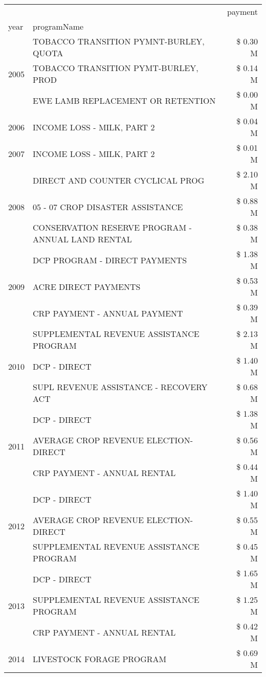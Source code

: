 \begin{tabular}{llr}
\toprule
 &  & payment \\
year & programName &  \\
\midrule
\multirow[t]{3}{*}{2005} & TOBACCO TRANSITION PYMNT-BURLEY, QUOTA & \$ 0.30 M \\
 & TOBACCO TRANSITION PYMT-BURLEY, PROD & \$ 0.14 M \\
 & EWE LAMB REPLACEMENT OR RETENTION & \$ 0.00 M \\
\cline{1-3}
2006 & INCOME LOSS - MILK, PART 2 & \$ 0.04 M \\
\cline{1-3}
2007 & INCOME LOSS - MILK, PART 2 & \$ 0.01 M \\
\cline{1-3}
\multirow[t]{3}{*}{2008} & DIRECT AND COUNTER CYCLICAL PROG & \$ 2.10 M \\
 & 05 - 07 CROP DISASTER ASSISTANCE & \$ 0.88 M \\
 & CONSERVATION RESERVE PROGRAM - ANNUAL LAND RENTAL & \$ 0.38 M \\
\cline{1-3}
\multirow[t]{3}{*}{2009} & DCP PROGRAM - DIRECT PAYMENTS & \$ 1.38 M \\
 & ACRE DIRECT PAYMENTS & \$ 0.53 M \\
 & CRP PAYMENT - ANNUAL PAYMENT & \$ 0.39 M \\
\cline{1-3}
\multirow[t]{3}{*}{2010} & SUPPLEMENTAL REVENUE ASSISTANCE PROGRAM & \$ 2.13 M \\
 & DCP - DIRECT & \$ 1.40 M \\
 & SUPL REVENUE ASSISTANCE - RECOVERY ACT & \$ 0.68 M \\
\cline{1-3}
\multirow[t]{3}{*}{2011} & DCP - DIRECT & \$ 1.38 M \\
 & AVERAGE CROP REVENUE ELECTION-DIRECT & \$ 0.56 M \\
 & CRP PAYMENT - ANNUAL RENTAL & \$ 0.44 M \\
\cline{1-3}
\multirow[t]{3}{*}{2012} & DCP - DIRECT & \$ 1.40 M \\
 & AVERAGE CROP REVENUE ELECTION-DIRECT & \$ 0.55 M \\
 & SUPPLEMENTAL REVENUE ASSISTANCE PROGRAM & \$ 0.45 M \\
\cline{1-3}
\multirow[t]{3}{*}{2013} & DCP - DIRECT & \$ 1.65 M \\
 & SUPPLEMENTAL REVENUE ASSISTANCE PROGRAM & \$ 1.25 M \\
 & CRP PAYMENT - ANNUAL RENTAL & \$ 0.42 M \\
\cline{1-3}
\multirow[t]{3}{*}{2014} & LIVESTOCK FORAGE PROGRAM & \$ 0.69 M \\

\end{tabular}
